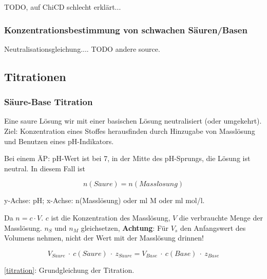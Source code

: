 TODO, auf ChiCD schlecht erklärt...

\subsubsection{Konzentrationsbestimmung von schwachen Säuren/Basen}

Neutralisationsgleichung.... TODO andere source.

\subsection{Titrationen}

\subsubsection{Säure-Base Titration}

Eine saure Lösung wir mit einer basischen Lösung neutralisiert (oder umgekehrt). Ziel: Konzentration eines Stoffes herausfinden durch Hinzugabe von Masslösung und Benutzen eines pH-Indikators.

\begin{definition}[Äquivalenzpunkt]
	Bei einem ÄP: pH-Wert ist bei 7, in der Mitte des pH-Sprungs, die Lösung ist neutral. In diesem Fall ist
	
	{\large
		\begin{equation}
			n(S\ddot{a}ure) = n(Massl\ddot{o}sung)
		\end{equation}	
	}
	
	y-Achse: pH; x-Achse: n(Masslösung) oder ml M oder ml mol/l.
\end{definition}

Da $n=c \cdot V$. $c$ ist die Konzentration des Masslösung, $V$ die verbrauchte Menge der Masslösung. $n_S$ und $n_M$ gleichsetzen, \textbf{Achtung}: Für $V_s$ den Anfangswert des Volumens nehmen, nicht der Wert mit der Masslösung drinnen!

{\large
	\begin{equation}
	\label{titration}
	V_{S\ddot{a}ure}\ \cdot \ c(S\ddot{a}ure) \ \cdot \ z_{S\ddot{a}ure} = V_{Base} \ \cdot \ c(Base) \ \cdot \ z_{Base}
	\end{equation}	
}

\ref{titration}: Grundgleichung der Titration.
